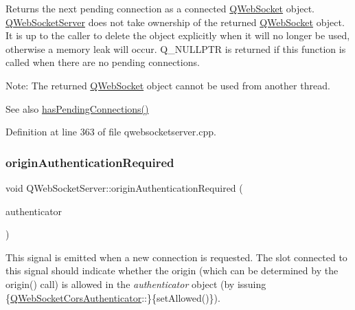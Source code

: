 Returns the next pending connection as a connected \mbox{\hyperlink{class_q_web_socket}{Q\+Web\+Socket}} object. \mbox{\hyperlink{class_q_web_socket_server}{Q\+Web\+Socket\+Server}} does not take ownership of the returned \mbox{\hyperlink{class_q_web_socket}{Q\+Web\+Socket}} object. It is up to the caller to delete the object explicitly when it will no longer be used, otherwise a memory leak will occur. Q\+\_\+\+N\+U\+L\+L\+P\+TR is returned if this function is called when there are no pending connections.

Note\+: The returned \mbox{\hyperlink{class_q_web_socket}{Q\+Web\+Socket}} object cannot be used from another thread.

\begin{DoxySeeAlso}{See also}
\mbox{\hyperlink{class_q_web_socket_server_a90cd25d1e2fb4fdcc3cc7fdb4858db41}{has\+Pending\+Connections()}} 
\end{DoxySeeAlso}


Definition at line 363 of file qwebsocketserver.\+cpp.

\mbox{\label{class_q_web_socket_server_adcd6db6ae81db4d88081c4113a47c3a4}} 
\subsubsection{\texorpdfstring{origin\+Authentication\+Required}{originAuthenticationRequired}}
{\footnotesize\ttfamily void Q\+Web\+Socket\+Server\+::origin\+Authentication\+Required (\begin{DoxyParamCaption}\item[{\mbox{\hyperlink{class_q_web_socket_cors_authenticator}{Q\+Web\+Socket\+Cors\+Authenticator}} $\ast$}]{authenticator }\end{DoxyParamCaption})\hspace{0.3cm}{\ttfamily [signal]}}

This signal is emitted when a new connection is requested. The slot connected to this signal should indicate whether the origin (which can be determined by the origin() call) is allowed in the {\itshape authenticator} object (by issuing \{\mbox{\hyperlink{class_q_web_socket_cors_authenticator}{Q\+Web\+Socket\+Cors\+Authenticator}}\+:\+:\}\{set\+Allowed()\}).

